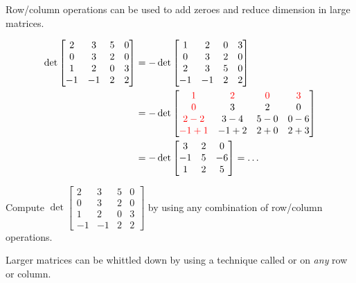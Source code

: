 \begin{applicationActivities}
\begin{observation}
Row/column operations can be used to add zeroes and reduce dimension
in large matrices.

\begin{align*}
    \det\begin{bmatrix} 
      2 & 3 & 5 & 0 \\ 
      0 & 3 & 2 & 0 \\ 
      1 & 2 & 0 & 3 \\ 
      -1 & -1 & 2 & 2 
    \end{bmatrix}
  &=
    -\det\begin{bmatrix}
      1 & 2 & 0 & 3 \\ 
      0 & 3 & 2 & 0 \\ 
      2 & 3 & 5 & 0 \\ 
      -1 & -1 & 2 & 2 
    \end{bmatrix}
  \\&=
    -\det\begin{bmatrix}
      \textcolor{red}{1} & \textcolor{red}{2} & 
         \textcolor{red}{0} & \textcolor{red}{3} \\ 
      \textcolor{red}{0} & 3 & 2 & 0 \\ 
      \textcolor{red}{2-2} & 3-4 & 5-0 & 0-6 \\ 
      \textcolor{red}{-1+1} & -1+2 & 2+0 & 2+3 
    \end{bmatrix}
  \\&=
    -\det\begin{bmatrix}
      3 & 2 & 0 \\ 
      -1 & 5 & -6 \\ 
      1 & 2 & 5 
    \end{bmatrix}
   = \dots
\end{align*} 
\end{observation}

\begin{activity}{10}
  Compute 
  \(
    \det\begin{bmatrix} 
      2 & 3 & 5 & 0 \\ 
      0 & 3 & 2 & 0 \\ 
      1 & 2 & 0 & 3 \\ 
      -1 & -1 & 2 & 2 
    \end{bmatrix}
  \) by using any combination of row/column operations.
\end{activity}

\begin{observation}
Larger matrices can be whittled down by using a technique called
 or  on
\textit{any} row or column.


\end{observation}
\end{applicationActivities}
